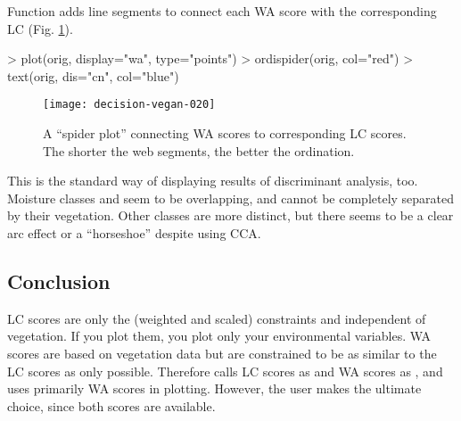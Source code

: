 \documentclass[a4paper,10pt,twocolumn]{article}
\begin{document}
Function  adds line segments to connect each WA
score with the corresponding LC (Fig.  \ref{fig:walcspider}).
\begin{Schunk}
\begin{Sinput}
> plot(orig, display="wa", type="points")
> ordispider(orig, col="red")
> text(orig, dis="cn", col="blue")
\end{Sinput}
\end{Schunk}
\begin{figure}
\texttt{[image: decision-vegan-020]}
\caption{A ``spider plot'' connecting WA scores to corresponding LC
  scores. The shorter the web segments, the better the ordination.}
\label{fig:walcspider}
\end{figure}
This is the standard way of displaying results of discriminant
analysis, too.  Moisture classes  and  seem to be
overlapping, and cannot be completely separated by their
vegetation. Other classes are more distinct, but there seems to be a
clear arc effect or a ``horseshoe'' despite using CCA.

\subsection{Conclusion}

LC scores are only the (weighted and scaled) constraints and
independent of vegetation. If you plot them, you plot only your
environmental variables. WA scores are based on vegetation data but
are constrained to be as similar to the LC scores as only
possible. Therefore  calls LC scores as
 and WA scores as , and uses
primarily WA scores in plotting.  However, the user makes the ultimate
choice, since both scores are available.


\end{document}
